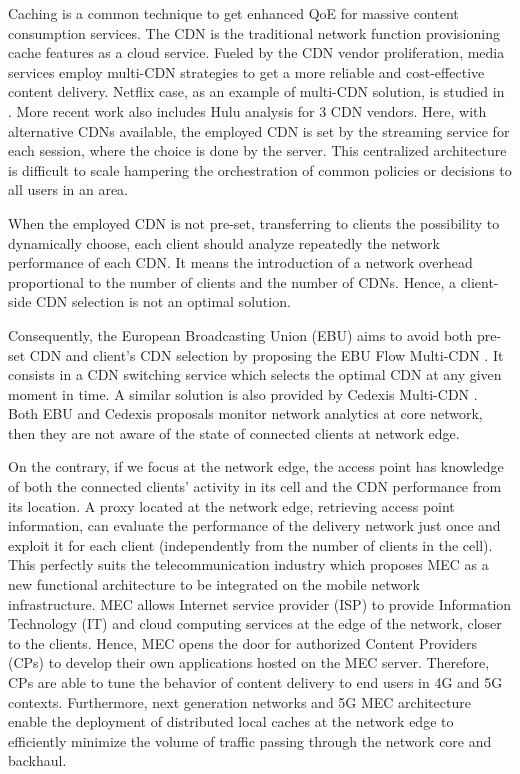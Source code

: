 Caching is a common technique to get enhanced QoE for massive content consumption services. The CDN is the traditional network function provisioning cache features as a cloud service. Fueled by the CDN vendor proliferation, media services employ multi-CDN strategies to get a more reliable and cost-effective content delivery. Netflix case, as an example of multi-CDN solution, is studied in \cite{adhikari2012}. More recent work \cite{adhikari2015} also includes Hulu analysis for 3 CDN vendors. Here, with alternative CDNs available, the employed CDN is set by the streaming service for each session, where the choice is done by the server. This centralized architecture is difficult to scale hampering the orchestration of common policies or decisions to all users in an area.

When the employed CDN is not pre-set, transferring to clients the possibility to dynamically choose, each client should analyze repeatedly the network performance of each CDN. It means the introduction of a network overhead proportional to the number of clients and the number of CDNs. Hence, a client-side CDN selection is not an optimal solution.

Consequently, the European Broadcasting Union (EBU) aims to avoid both pre-set CDN and client's CDN selection by proposing the EBU Flow Multi-CDN \cite{EurovisionFLOW}. It consists in a CDN switching service which selects the optimal CDN at any given moment in time. A similar solution is also provided by Cedexis Multi-CDN \cite{cedexis}. Both EBU and Cedexis proposals monitor network analytics at core network, then they are not aware of the state of connected clients at network edge.

On the contrary, if we focus at the network edge, the access point has knowledge of both the connected clients' activity in its cell and the CDN performance from its location. A proxy located at the network edge, retrieving access point information, can evaluate the performance of the delivery network just once and exploit it for each client (independently from the number of clients in the cell). This perfectly suits the telecommunication industry which proposes MEC as a new functional architecture to be integrated on the mobile network infrastructure. MEC allows Internet service provider (ISP) to provide Information Technology (IT) and cloud computing services at the edge of the network, closer to the clients. Hence, MEC opens the door for authorized Content Providers (CPs) to develop their own applications hosted on the MEC server. Therefore, CPs are able to tune the behavior of content delivery to end users in 4G and 5G contexts. Furthermore, next generation networks and 5G MEC architecture enable the deployment of distributed local caches at the network edge to efficiently minimize the volume of traffic passing through the network core and backhaul.

